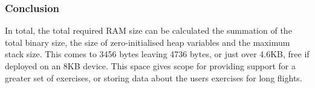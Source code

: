 \subsubsection{Conclusion}

In total, the total required RAM size can be calculated the summation of the total binary size, the size of zero-initialised heap variables and the maximum stack size. This comes to 3456 bytes leaving 4736 bytes, or just over 4.6KB, free if deployed on an 8KB device. This space gives scope for providing support for a greater set of exercises, or storing data about the users exercises for long flights.
